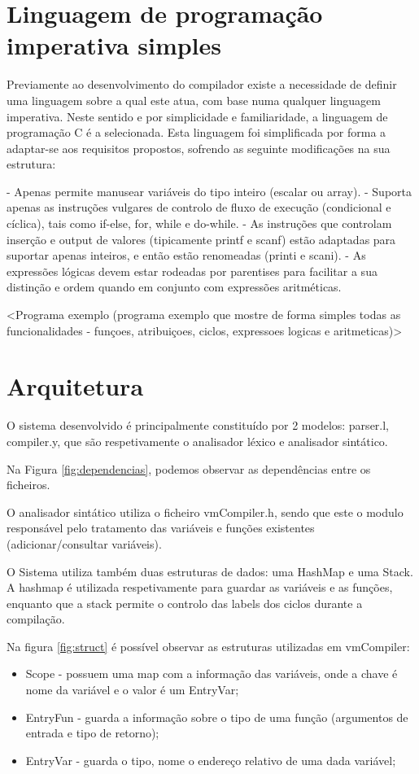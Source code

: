 \documentclass[a4paper,10pt]{report}
\begin{document}
\section{Linguagem de programação imperativa simples}
    Previamente ao desenvolvimento do compilador existe a necessidade de definir uma linguagem sobre a qual este atua, com base numa qualquer linguagem imperativa. Neste sentido e por simplicidade e familiaridade, a linguagem de programação C é a selecionada. Esta linguagem foi simplificada por forma a adaptar-se aos requisitos propostos, sofrendo as seguinte modificações na sua estrutura:

    - Apenas permite manusear variáveis do tipo inteiro (escalar ou array).
    - Suporta apenas as instruções vulgares de controlo de fluxo de execução (condicional e cíclica), tais como if-else, for, while e do-while.
    - As instruções que controlam inserção e output de valores (tipicamente printf e scanf) estão adaptadas para suportar apenas inteiros, e então estão renomeadas (printi e scani).
    - As expressões lógicas devem estar rodeadas por parentises para facilitar a sua distinção e ordem quando em conjunto com expressões aritméticas. 


    <Programa exemplo (programa exemplo que mostre de forma simples todas as funcionalidades - funçoes, atribuiçoes, ciclos, expressoes logicas e aritmeticas)> 

\section{Arquitetura}
    O sistema desenvolvido é principalmente constituído por 2 modelos:  parser.l, compiler.y, que são respetivamente o analisador léxico e analisador sintático. 

    Na Figura \ref{fig:dependencias}, podemos observar as dependências entre os ficheiros.

    O analisador sintático utiliza o ficheiro vmCompiler.h, sendo que este o modulo responsável pelo tratamento das variáveis e funções existentes (adicionar/consultar variáveis).

    O Sistema utiliza também duas estruturas de dados: uma HashMap e uma Stack. A hashmap é utilizada respetivamente para guardar as variáveis e as funções, enquanto que a stack permite o controlo das labels dos ciclos durante a compilação.

    Na figura \ref{fig:struct} é possível observar as estruturas utilizadas em vmCompiler:
    \begin{itemize}
      \item Scope - possuem uma map com a informação das variáveis, onde a chave é nome da variável e o valor é um EntryVar;
      \item EntryFun - guarda a informação sobre o tipo de uma função (argumentos de entrada e tipo de retorno);
      \item EntryVar - guarda o tipo, nome o endereço relativo de uma dada variável;
    \end{itemize}
\end{document}
